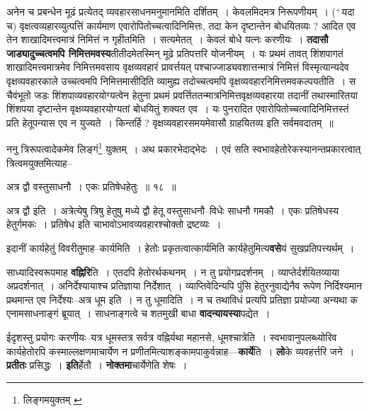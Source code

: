 \documentclass[article,12pt,a4paper]{memoir}
\newcommand{\add}[1]{($^{+}$#1)}
\begin{document}
	  \pstart अनेन च प्रबन्धेन मूढं प्रत्येतद् व्यवहारसाधनमनुमानमिति दर्शितम् । केवलमिदमत्र निरूपणीयम् । \add{यदा च} वृक्षत्वव्यहारव्युत्पत्तिं कार्यमाण एवारोपितोच्चत्वादिनिमित्तः, तदा केन दृष्टान्तेन बोधयितव्यः ? आदित एव तेन शाखादिमत्त्वमात्रं निमित्तं न गृहीतमिति । सत्यमेतत् । केवलं बोधे यत्नः करणीयः । \textbf{तदासौ जाड्यादुच्चत्वमपि निमित्तमवस्य}तीतीदमेतस्मिन् मूढे प्रतिपत्तरि योजनीयम् । यः प्रथमं तावत् शिंशपागतं शाखादिमत्त्वमात्रमेव निमित्तमवसाय वृक्षव्यवहारं प्रावर्त्तयत् पश्चाज्जाड्यवशात्तन्मात्रं निमित्तं विस्मृत्यान्यदेव वृक्षव्यवहारकाले उच्चत्वमपि निमित्तमासीदिति व्यामुह्य तदोच्चत्वमपि वृक्षव्यवहारनिमित्तमवकल्पयतीति । स चैवंभूतो जडः शिंशपाव्यवहारयोग्यत्वेन हेतुना प्रथमं प्रवर्त्तिततन्मात्रनिमित्तवृक्षव्यवहारया तदानीं तथास्मारितया शिंशपया दृष्टान्तेन वृक्षव्यवहारयोग्यतां बोधयितुं शक्यत एव । यः पुनरादित एवारोपितोच्चत्वादिनिमित्तस्तं प्रति हेतूपन्यास एव न युज्यते । किन्तर्हि ? वृक्षव्यवहारसमयमेवासौ ग्राहयितव्य इति सर्वमवदातम् ॥
	\pend
	  \bigskip
	  \begingroup
	

	  \pstart ननु त्रिरूपत्वादेकमेव लिङ्गं\footnote{लिङ्गमयुक्तम् \cite{dp-msB} \cite{dp-msC} \cite{dp-msD} \cite{dp-edP} \cite{dp-edH} \cite{dp-edE} \cite{dp-edN}} युक्तम् । अथ प्रकारभेदाद्भेदः । एवं सति स्वभावहेतोरेकस्यानन्तप्रकारत्वात् त्रित्वमयुक्तमित्याह--
	\pend
       
	  \bigskip
	  \begingroup
	

	  \pstart अत्र द्वौ वस्तुसाधनौ । एकः प्रतिषेधहेतुः ॥ १८ ॥
	\pend
      
	  \endgroup
	 

	  \pstart अत्र द्वौ इति । अत्रेत्येषु त्रिषु हेतुषु मध्ये द्वौ हेतू वस्तुसाधनौ--विधेः साधनौ गमकौ । एकः प्रतिषेधस्य हेतुर्गमकः । प्रतिषेध इति चाभावोऽभावव्यवहारश्चोक्तो द्रष्टव्यः ।
	\pend
      
	  \endgroup
	

	  \pstart इदानीं कार्यहेतुं विवरीतुमाह--कार्यमिति । हेतोः प्रकृतत्वात्कार्यमिति कार्यहेतुमित्य\textbf{वसे}यं सुखप्रतिपत्त्यर्थम् ।
	\pend
      

	  \pstart साध्यादिस्वरूपमाह \textbf{वह्निरि}ति । एतदपि हेतोरर्थकथनम् । न तु प्रयोगप्रदर्शनम् । व्याप्तेर्दर्शयितव्याया अप्रदर्शनात् । अनिर्देश्यायाश्च प्रतिज्ञाया निर्देशात् । व्याप्तिवेदिन्यपि पुंसि हेतुरनुवाद्येनैव रूपेण निर्दिश्यमान प्रथमान्त एव निर्देश्यः--अत्र धूम इति । न तु धूमादिति । न च तथाविधं प्रत्यपि प्रतिज्ञा प्रयोज्या अन्यथा क एनामसाधनाङ्गं ब्रूयात् । साधनाङ्गत्वे च शतमुखी बाधा \textbf{वादन्यायस्या}पद्येत ।
	\pend
      

	  \pstart ईदृशस्तु प्रयोगः करणीयः--यत्र धूमस्तत्र सर्वत्र वह्निर्यथा महानसे, धूमश्चात्रेति । स्वभावानुपलब्ध्योरिव कार्यहेतोरपि कस्माल्लक्षणमाचार्येण न प्रणीतमित्याशङ्कामपाकुर्वन्नाह—\textbf{कार्ये}ति । \textbf{लो}के व्यवहर्त्तरि जने । \textbf{प्रतीतः} प्रसिद्धः । \textbf{इति}र्हेतौ । \textbf{नोक्तमा}चार्येणेति शेषः ।
	\pend
      
\end{document}
